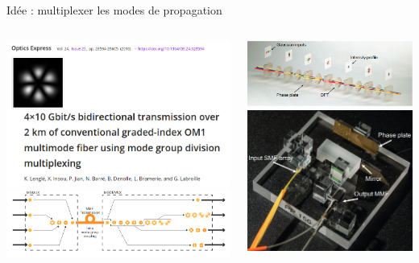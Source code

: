 \documentclass[aspectratio=149, 10pt, t]{beamer}
\begin{document}
\begin{frame}{Idée : multiplexer les modes de propagation}
    \begin{columns}[b]
        \begin{column}{0.5\linewidth}
            \includegraphics[width=\linewidth]{images/papier_multiplex}
            \includegraphics[width=\linewidth]{images/mode_multiplex_expl}
        \end{column}
        \begin{column}{0.5\linewidth}
            \centering
            \includegraphics[width=\linewidth]{images/mode_multiplex_3D}
            \includegraphics[width=0.7\linewidth]{images/mode_multiplex_photo}

\end{column}
\end{columns}
\end{frame}
\end{document}
